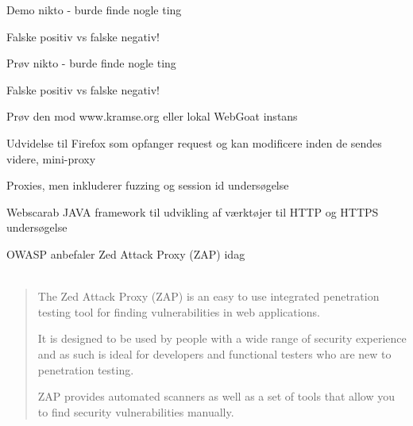 \documentclass[20pt,landscape,a4paper,footrule]{foils}
\begin{document}
\begin{list1}
\item Demo nikto - burde finde nogle ting
\item Falske positiv vs falske negativ!
\end{list1}



\begin{list1}
\item Prøv nikto - burde finde nogle ting
\item Falske positiv vs falske negativ!
\item Prøv den mod www.kramse.org eller lokal WebGoat instans
\end{list1}





Udvidelse til Firefox som opfanger request og kan modificere inden de sendes videre, mini-proxy\\




\begin{list1}
\item Proxies, men inkluderer fuzzing og session id undersøgelse
\item Webscarab JAVA framework til udvikling af værktøjer til HTTP og HTTPS undersøgelse\\

\item OWASP anbefaler Zed Attack Proxy (ZAP) idag\\
\\
\end{list1}


\begin{quote}
The Zed Attack Proxy (ZAP) is an easy to use integrated penetration testing tool for finding vulnerabilities in web applications.

It is designed to be used by people with a wide range of security experience and as such is ideal for developers and functional testers who are new to penetration testing.

ZAP provides automated scanners as well as a set of tools that allow you to find security vulnerabilities manually.
\end{quote}
\end{document}
